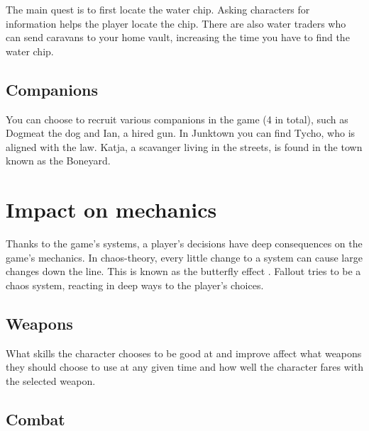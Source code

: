 The main quest is to first locate the water chip. Asking characters for information helps the player locate the chip. There are also water traders who can send caravans to your home vault, increasing the time you have to find the water chip.

\subsection{Companions}

You can choose to recruit various companions in the game (4 in total), such as Dogmeat the dog and Ian, a hired gun. In Junktown you can find Tycho, who is aligned with the law. Katja, a scavanger living in the streets, is found in the town known as the Boneyard.



\section{Impact on mechanics}

Thanks to the game's systems, a player's decisions have deep consequences on the game's mechanics. In chaos-theory, every little change to a system can cause large changes down the line. This is known as the butterfly effect \autocite{chaos}. Fallout tries to be a chaos system, reacting in deep ways to the player's choices.

\subsection{Weapons}

What skills the character chooses to be good at and improve affect what weapons they should choose to use at any given time and how well the character fares with the selected weapon.


\subsection{Combat}

